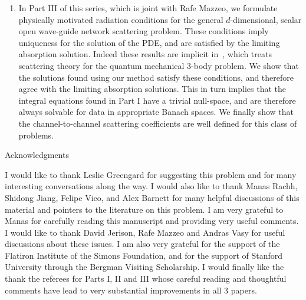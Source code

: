 \documentclass[11pt]{article}
\theoremstyle{definition}
\theoremstyle{remark}
\begin{document}
\begin{enumerate}
\item In Part III of this series, which is joint with Rafe Mazzeo, we formulate
  physically motivated radiation conditions for the general $d$-dimensional,
  scalar open wave-guide network scattering problem. These conditions imply uniqueness
  for the solution of the PDE, and are satisfied
  by the limiting absorption solution. Indeed these results are implicit
  in~\cite{Vasy2000}, which treats scattering theory for the quantum mechanical
  3-body problem. We  show that the solutions found using our method
  satisfy these conditions, and therefore agree with the limiting absorption
  solutions.  This in turn implies that the integral equations found in Part I
  have a trivial null-space, and are therefore always solvable for data in
  appropriate Banach spaces. We finally show that the channel-to-channel
  scattering coefficients are well defined for this class of problems.
\end{enumerate}

 


{\small
  
\centerline{\sc Acknowledgments} I would like to thank Leslie Greengard for
suggesting this problem and for many interesting conversations along the way. I
would also like to thank Manas Rachh, Shidong Jiang, Felipe Vico, and Alex Barnett for many
helpful discussions of this material and pointers to the literature on this
problem. I am very grateful to Manas for carefully reading this manuscript
and providing very useful comments. I would like to thank David Jerison, Rafe
Mazzeo and Andras Vasy for useful discussions about these issues. I am also
very grateful for the support of the Flatiron Institute of the Simons
Foundation, and for the support of Stanford University through the Bergman
Visiting Scholarship.  I would finally like the thank the referees for Parts I,
II and III whose careful reading and thoughtful comments have lead to very substantial
improvements in all 3 papers. }
\end{document}
